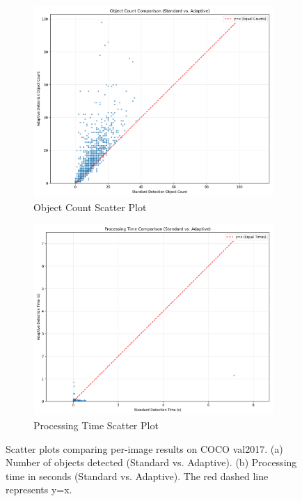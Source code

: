 \documentclass{article}
\begin{document}
\begin{figure}[p] %
    \centering
    \begin{subfigure}[b]{0.48\textwidth}
        \includegraphics[width=\linewidth]{figures/object_count_scatter.png}
        \caption{Object Count Scatter Plot}
        \label{fig:count_scatter}
    \end{subfigure}
    \hfill %
    \begin{subfigure}[b]{0.48\textwidth}
        \includegraphics[width=\linewidth]{figures/processing_time_scatter.png}
        \caption{Processing Time Scatter Plot}
        \label{fig:time_scatter}
    \end{subfigure}

    \caption{Scatter plots comparing per-image results on COCO val2017. (a) Number of objects detected (Standard vs. Adaptive). (b) Processing time in seconds (Standard vs. Adaptive). The red dashed line represents y=x.}
    \label{fig:scatter_plots}
\end{figure}
\end{document}
